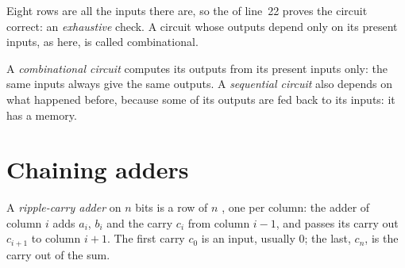 \label{lst:g11:gates-to-arithmetic-unit:full-adder}

\label{out:g11:gates-to-arithmetic-unit:full-adder}

Eight rows are all the inputs there are, so the  of line~22 proves the circuit correct: an
\emph{exhaustive} check. A circuit whose outputs depend only on its present inputs, as here, is called
combinational.

\begin{definition}\label{def:g11:gates-to-arithmetic-unit:combinational}
A \emph{combinational circuit} computes its outputs from its present inputs only: the
same inputs always give the same outputs. A \emph{sequential circuit} also depends on what
happened before, because some of its outputs are fed back to its inputs: it has a memory.
\end{definition}

\section{Chaining adders}\label{sec:g11:gates-to-arithmetic-unit:ripple}

\begin{definition}\label{def:g11:gates-to-arithmetic-unit:ripple}
A \emph{ripple-carry adder} on $n$ bits is a row of $n$ , one per column: the
adder of column $i$ adds $a_i$, $b_i$ and the carry $c_i$ from column $i - 1$, and passes its carry out $c_{i+1}$ to
column $i + 1$. The first carry $c_0$ is an input, usually $0$; the last, $c_n$, is the carry out of the sum.
\end{definition}


